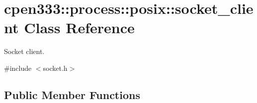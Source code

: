 \hypertarget{classcpen333_1_1process_1_1posix_1_1socket__client}{}\section{cpen333\+:\+:process\+:\+:posix\+:\+:socket\+\_\+client Class Reference}
\label{classcpen333_1_1process_1_1posix_1_1socket__client}


Socket client.  




{\ttfamily \#include $<$socket.\+h$>$}

\subsection*{Public Member Functions}
